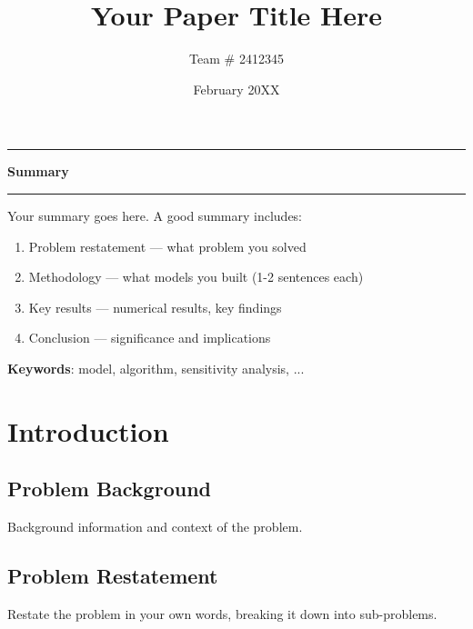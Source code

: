 \documentclass[12pt]{article}
\title{\textbf{Your Paper Title Here}}
\author{Team \# 2412345}
\date{February 20XX}
\begin{document}
\maketitle
\thispagestyle{empty}

\begin{center}
\rule{\textwidth}{0.5pt}
\textbf{Summary}
\rule{\textwidth}{0.5pt}
\end{center}

\vspace{6pt}


Your summary goes here. A good summary includes:
\begin{enumerate}
    \item Problem restatement — what problem you solved
    \item Methodology — what models you built (1-2 sentences each)
    \item Key results — numerical results, key findings
    \item Conclusion — significance and implications
\end{enumerate}

\textbf{Keywords}: model, algorithm, sensitivity analysis, ...

\newpage


\tableofcontents
\newpage

\section{Introduction}

\subsection{Problem Background}
Background information and context of the problem.

\subsection{Problem Restatement}
Restate the problem in your own words, breaking it down into sub-problems.
\end{document}
